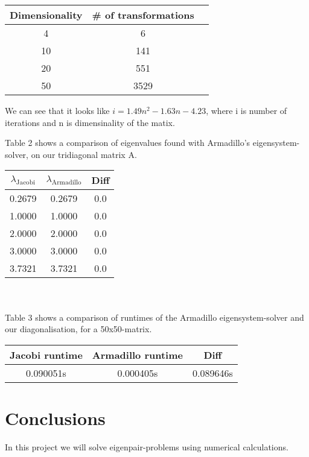 \documentclass{article}
\begin{document}
	\begin{tabular}{c c c}
		Dimensionality & \# of transformations\\
		\hline
		4 & 6 \\
		10 & 141 \\
		20 & 551 \\
		50 & 3529
	\end{tabular}

	We can see that it looks like $i = 1.49n^2 - 1.63n - 4.23$, where i is number of iterations and n is dimensinality of the matix.

	Table 2 shows a comparison of eigenvalues found with Armadillo's eigensystem-solver, on our tridiagonal matrix A.\\
	\begin{tabular}{c c c}
		$\lambda_{\text{Jacobi}}$ & $\lambda_{\text{Armadillo}}$ & Diff\\
		\hline
		0.2679 & 0.2679 & 0.0 \\
		1.0000 & 1.0000 & 0.0 \\
		2.0000 & 2.0000 & 0.0 \\
		3.0000 & 3.0000 & 0.0 \\
		3.7321 & 3.7321 & 0.0
	\end{tabular} \\ \\

	Table 3 shows a comparison of runtimes of the Armadillo eigensystem-solver and our diagonalisation, for a 50x50-matrix.\\

	\begin{tabular}{c c c}
		Jacobi runtime & Armadillo runtime & Diff\\
		\hline
		0.090051s & 0.000405s & 0.089646s
	\end{tabular}



\section{Conclusions}
	In this project we will solve eigenpair-problems using numerical calculations.
\end{document}
